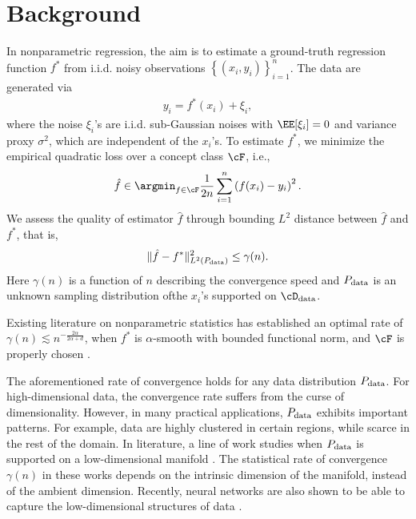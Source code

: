 \section{Background}

In nonparametric regression, the aim is to estimate a ground-truth regression function $f^*$ from i.i.d. noisy observations $\left\{(x_i, y_i)\right\}_{i=1}^n$. The data are generated via
\begin{align*}
y_i = f^*(x_i) + \xi_i,
\end{align*}
where the noise $\xi_i$'s are i.i.d. sub-Gaussian noises with $\EE[\xi_i]=0$ and variance proxy $\sigma^2$, which are independent of the $x_i$'s. To estimate $f^*$, we minimize the empirical quadratic loss over a concept class $\cF$, i.e.,
\begin{align}\label{eq: obj}
\hat{f} \in \argmin_{f \in \cF} \frac{1}{2n} \sum_{i=1}^n \left(f(x_i) - y_i \right)^2.
\end{align}
We assess the quality of estimator $\hat{f}$ through bounding $L^2$ distance between $\hat{f}$ and $f^*$, that is,
\begin{align*}
\|\hat{f} - f^*\|_{L^2(P_{\rm data})}^2 \leq \gamma(n).
\end{align*}
Here $\gamma(n)$ is a function of $n$ describing the convergence speed and $P_{\rm data}$ is an unknown sampling distribution ofthe  $x_i$'s supported on $\cD_{\rm data}$.

Existing literature on nonparametric statistics has established an optimal rate of $\gamma(n) \lesssim n^{-\frac{2\alpha}{2\alpha + d}}$, when $f^*$ is $\alpha$-smooth with bounded functional norm, and $\cF$ is properly chosen \citep{wahba1990spline, altman1992introduction, fan1996local, tsybakov2008introduction, gyorfi2006distribution}.

The aforementioned rate of convergence holds for any data distribution $P_{\rm data}$. For high-dimensional data, the convergence rate suffers from the curse of dimensionality. However, in many practical applications, $P_{\rm data}$ exhibits important patterns. For example, data are highly clustered in certain regions, while scarce in the rest of the domain. In literature, a line of work studies when $P_{\rm data}$ is supported on a low-dimensional manifold \citep{BickelLi, cheng2012local, liao2021multiscale, NIPS2011_4455, NIPS2013_5103, yang2015minimax}. The statistical rate of convergence $\gamma(n)$ in these works depends on the intrinsic dimension of the manifold, instead of the ambient dimension. Recently, neural networks are also shown to be able to capture the low-dimensional structures of data \citep{schmidt2019deep, nakada2020adaptive, chen2022nonparametric}.

